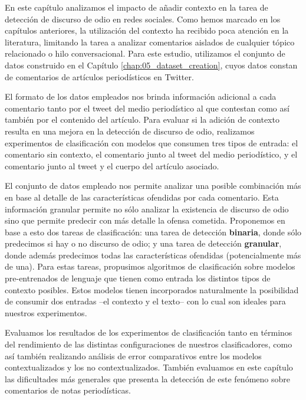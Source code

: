 \label{chap:06_contextualized_hate_speech}

En este capítulo analizamos el impacto de añadir contexto en la tarea de detección de discurso de odio en redes sociales. Como hemos marcado en los capítulos anteriores, la utilización del contexto ha recibido poca atención en la literatura, limitando la tarea a analizar comentarios aislados de cualquier tópico relacionado o hilo conversacional. Para este estudio, utilizamos el conjunto de datos construido en el Capítulo \ref{chap:05_dataset_creation}, cuyos datos constan de comentarios de artículos periodísticos en Twitter.

El formato de los datos empleados nos brinda información adicional a cada comentario tanto por el tweet del medio periodístico al que contestan como así también por el contenido del artículo. Para evaluar si la adición de contexto resulta en una mejora en la detección de discurso de odio, realizamos experimentos de clasificación con modelos que consumen tres tipos de entrada: el comentario sin contexto, el comentario junto al tweet del medio periodístico, y el comentario junto al tweet y el cuerpo del artículo asociado.

El conjunto de datos empleado nos permite analizar una posible combinación más en base al detalle de las características ofendidas por cada comentario. Esta información granular permite no sólo analizar la existencia de discurso de odio sino que permite predecir con más detalle la ofensa cometida. Proponemos en base a esto dos tareas de clasificación: una tarea de detección \textbf{binaria}, donde sólo predecimos si hay o no discurso de odio; y una tarea de detección \textbf{granular}, donde además predecimos todas las características ofendidas (potencialmente más de una). Para estas tareas, propusimos algoritmos de clasificación sobre modelos pre-entrenados de lenguaje que tienen como entrada los distintos tipos de contexto posibles. Estos modelos tienen incorporados naturalmente la posibilidad de consumir dos entradas --el contexto y el texto-- con lo cual son ideales para nuestros experimentos.

Evaluamos los resultados de los experimentos de clasificación tanto en términos del rendimiento de las distintas configuraciones de nuestros clasificadores, como así también realizando análisis de error comparativos entre los modelos contextualizados y los no contextualizados. También evaluamos en este capítulo las dificultades más generales que presenta la detección de este fenómeno sobre comentarios de notas periodísticas.

